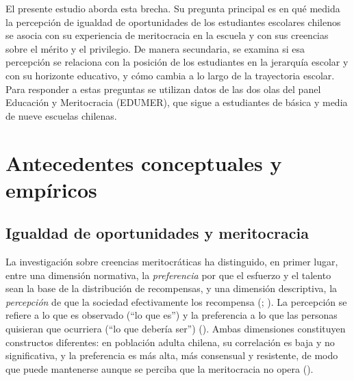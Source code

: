 \documentclass[
  spanish,
  a4paper,
  oneside]{scrbook}
\begin{document}
El presente estudio aborda esta brecha. Su pregunta principal es en qué
medida la percepción de igualdad de oportunidades de los estudiantes
escolares chilenos se asocia con su experiencia de meritocracia en la
escuela y con sus creencias sobre el mérito y el privilegio. De manera
secundaria, se examina si esa percepción se relaciona con la posición de
los estudiantes en la jerarquía escolar y con su horizonte educativo, y
cómo cambia a lo largo de la trayectoria escolar. Para responder a estas
preguntas se utilizan datos de las dos olas del panel Educación y
Meritocracia (EDUMER), que sigue a estudiantes de básica y media de
nueve escuelas chilenas.


\chapter{Antecedentes conceptuales y
empíricos}\label{antecedentes-conceptuales-y-empuxedricos}

\section{Igualdad de oportunidades y
meritocracia}\label{igualdad-de-oportunidades-y-meritocracia}

La investigación sobre creencias meritocráticas ha distinguido, en
primer lugar, entre una dimensión normativa, la \emph{preferencia} por
que el esfuerzo y el talento sean la base de la distribución de
recompensas, y una dimensión descriptiva, la \emph{percepción} de que la
sociedad efectivamente los recompensa
(;
). La
percepción se refiere a lo que es observado (``lo que es'') y la
preferencia a lo que las personas quisieran que ocurriera (``lo que
debería ser'') (). Ambas dimensiones constituyen constructos diferentes: en
población adulta chilena, su correlación es baja y no significativa, y
la preferencia es más alta, más consensual y resistente, de modo que
puede mantenerse aunque se perciba que la meritocracia no opera
().
\end{document}
